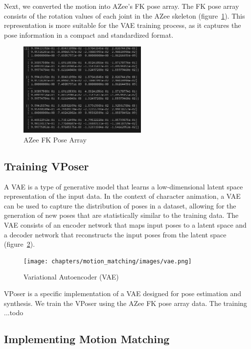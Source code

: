 \documentclass[../../main.tex]{subfiles}
\begin{document}
Next, we converted the motion into AZee's FK pose array. The FK pose array consists of the rotation values of each joint in the AZee skeleton (figure~\ref{fig:azee_fk_pose}). This representation is more suitable for the VAE training process, as it captures the pose information in a compact and standardized format.

\begin{figure}
  \centering \includegraphics[width = 2.5in]{chapters/motion_matching/images/azee_fk_pose.png}
  \caption{AZee FK Pose Array}
  \label{fig:azee_fk_pose}
\end{figure}

\subsection{Training VPoser}
\label{ch:motion_matching:motion_matching_with_azee:training}

A VAE is a type of generative model that learns a low-dimensional latent space representation of the input data. In the context of character animation, a VAE can be used to capture the distribution of poses in a dataset, allowing for the generation of new poses that are statistically similar to the training data. The VAE consists of an encoder network that maps input poses to a latent space and a decoder network that reconstructs the input poses from the latent space (figure~\ref{fig:vae}).

\begin{figure}
  \centering \texttt{[image: chapters/motion\_matching/images/vae.png]}
  \caption{Variational Autoencoder (VAE)}
  \label{fig:vae}
\end{figure}

VPoser is a specific implementation of a VAE designed for pose estimation and synthesis. We train the VPoser using the AZee FK pose array data. The training ...todo

\subsection{Implementing Motion Matching}
\label{ch:motion_matching:motion_matching_with_azee:implementation}
\end{document}
